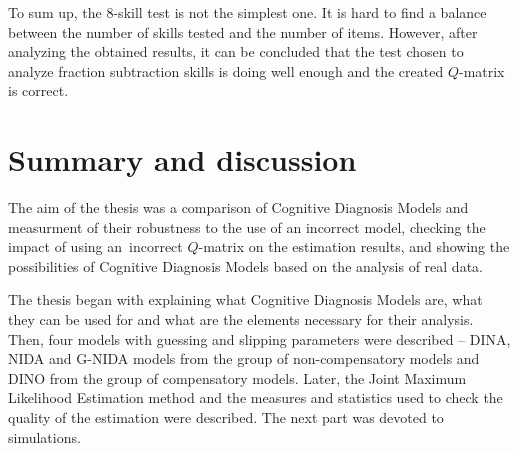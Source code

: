 \documentclass[english]{pwr_wmat_praca_dyplomowa}
\theoremstyle{plain}
\numberwithin{theorem}{chapter}
\theoremstyle{definition}
\numberwithin{theorem}{chapter}
\begin{document}
	To sum up, the 8-skill test is not the simplest one. It is hard to find a balance between the number of skills tested and the number of items. However, after analyzing the obtained results, it can be concluded that the test chosen to analyze fraction subtraction skills is doing well enough and the created $Q$-matrix is correct.
	
	{\backmatter \chapter{Summary and discussion}}
	
	
	The aim of the thesis was a comparison of Cognitive Diagnosis Models and measurment of their robustness to the use of an incorrect model, checking the impact of using an~incorrect $Q$-matrix on the estimation results, and showing the possibilities of Cognitive Diagnosis Models based on the analysis of real data.
	
	The thesis began with explaining what Cognitive Diagnosis Models are, what they can be used for and what are the elements necessary for their analysis. Then, four models with guessing and slipping parameters were described -- DINA, NIDA and G-NIDA models from the group of non-compensatory models and DINO from the group of compensatory models. Later, the Joint Maximum Likelihood Estimation method and the measures and statistics used to check the quality of the estimation were described. The next part was devoted to simulations.
	
\end{document}
